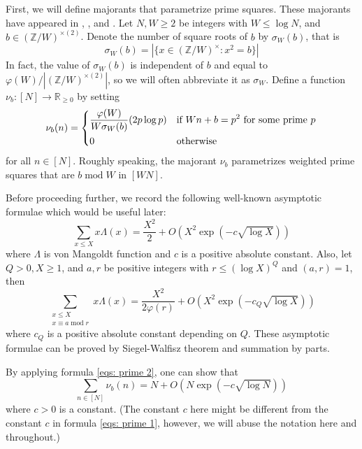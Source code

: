 \documentclass[11pt]{amsart}
\theoremstyle{plain} %
\theoremstyle{remark}
\numberwithin{equation}{section}
\newcommand{\R}{\mathbb{R}}
\newcommand{\Z}{\mathbb{Z}}
\begin{document}
First, we will define majorants that parametrize prime squares. These majorants have appeared in \cite{Chow}, \cite{Gao}, \cite{zhao2025densitytheoremprimesquares} and \cite{Tan}. Let $N,W\geq 2$ be integers with $W\leq \log N$, and $b\in (\Z/W)^{\times(2)}$. Denote the number of square roots of $b$ by $\sigma_W(b)$, that is
\begin{equation*}
    \sigma_W(b)=|\{x\in (\Z/W)^{\times}:x^2=b\}|
\end{equation*}
In fact, the value of $\sigma_W(b)$ is independent of $b$ and equal to $\varphi(W)/|(\Z/W)^{\times(2)}|$, so we will often abbreviate it as $\sigma_W$. Define a function $\nu_b:[N]\longrightarrow\R_{\geq 0}$ by setting
\begin{equation*}
    \nu_b(n)=\begin{dcases}
        \frac{\varphi(W)}{W\sigma_W(b)}(2p\log p)&\text{if $Wn+b=p^2$ for some prime $p$}\\
        0&\text{otherwise}
    \end{dcases}
\end{equation*}
for all $n\in [N]$. Roughly speaking, the majorant $\nu_b$ parametrizes weighted prime squares that are $b\;\mathrm{mod}\;W$ in $[WN]$.

Before proceeding further, we record the following well-known asymptotic formulae which would be useful later:
\begin{equation}\label{eqs: prime 1}
    \sum_{x\leq X}x\Lambda(x)=\frac{X^2}{2}+O(X^2\exp(-c\sqrt{\log X}))
\end{equation}
where $\Lambda$ is von Mangoldt function and $c$ is a positive absolute constant. Also, let $Q>0,X\geq 1$, and $a,r$ be positive integers with $r\leq (\log X)^Q$ and $(a,r)=1$, then
\begin{equation}\label{eqs: prime 2}
    \sum_{\substack{x\leq X\\x\equiv a\;\mathrm{mod}\;r}}x\Lambda(x)=\frac{X^2}{2\varphi(r)}+O(X^2\exp(-c_Q\sqrt{\log X}))
\end{equation}
where $c_Q$ is a positive absolute constant depending on $Q$. These asymptotic formulae can be proved by Siegel-Walfisz theorem and summation by parts.

By applying formula \eqref{eqs: prime 2}, one can show that
\begin{equation*}
    \sum_{n\in [N]}\nu_b(n)=N+O(N\exp(-c\sqrt{\log N}))
\end{equation*}
where $c>0$ is a constant. (The constant $c$ here might be different from the constant $c$ in formula \eqref{eqs: prime 1}, however, we will abuse the notation here and throughout.)
\end{document}
